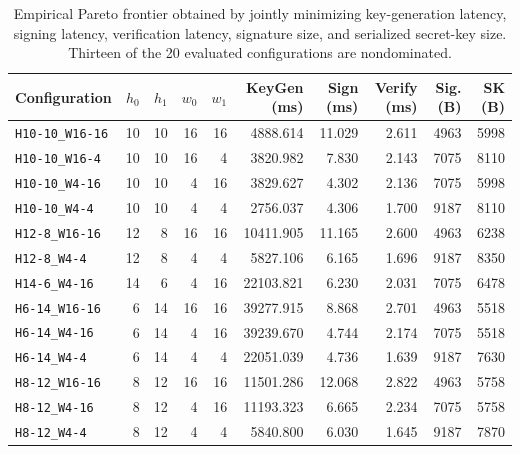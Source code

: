
\begin{table}[t]
\centering
\caption{Empirical Pareto frontier obtained by jointly minimizing key-generation latency, signing latency, verification latency, signature size, and serialized secret-key size. Thirteen of the 20 evaluated configurations are nondominated.}
\label{tab:pareto}
\scriptsize
\setlength{\tabcolsep}{2.5pt}
\begin{tabular}{lrrrrrrrrr}
\toprule
Configuration &
$h_0$ & $h_1$ & $w_0$ & $w_1$ &
KeyGen (ms) & Sign (ms) & Verify (ms) &
Sig. (B) & SK (B) \\
\midrule
\nolinkurl{H10-10_W16-16} & 10 & 10 & 16 & 16 & 4888.614 & 11.029 & 2.611 & 4963 & 5998 \\
\nolinkurl{H10-10_W16-4} & 10 & 10 & 16 & 4 & 3820.982 & 7.830 & 2.143 & 7075 & 8110 \\
\nolinkurl{H10-10_W4-16} & 10 & 10 & 4 & 16 & 3829.627 & 4.302 & 2.136 & 7075 & 5998 \\
\nolinkurl{H10-10_W4-4} & 10 & 10 & 4 & 4 & 2756.037 & 4.306 & 1.700 & 9187 & 8110 \\
\nolinkurl{H12-8_W16-16} & 12 & 8 & 16 & 16 & 10411.905 & 11.165 & 2.600 & 4963 & 6238 \\
\nolinkurl{H12-8_W4-4} & 12 & 8 & 4 & 4 & 5827.106 & 6.165 & 1.696 & 9187 & 8350 \\
\nolinkurl{H14-6_W4-16} & 14 & 6 & 4 & 16 & 22103.821 & 6.230 & 2.031 & 7075 & 6478 \\
\nolinkurl{H6-14_W16-16} & 6 & 14 & 16 & 16 & 39277.915 & 8.868 & 2.701 & 4963 & 5518 \\
\nolinkurl{H6-14_W4-16} & 6 & 14 & 4 & 16 & 39239.670 & 4.744 & 2.174 & 7075 & 5518 \\
\nolinkurl{H6-14_W4-4} & 6 & 14 & 4 & 4 & 22051.039 & 4.736 & 1.639 & 9187 & 7630 \\
\nolinkurl{H8-12_W16-16} & 8 & 12 & 16 & 16 & 11501.286 & 12.068 & 2.822 & 4963 & 5758 \\
\nolinkurl{H8-12_W4-16} & 8 & 12 & 4 & 16 & 11193.323 & 6.665 & 2.234 & 7075 & 5758 \\
\nolinkurl{H8-12_W4-4} & 8 & 12 & 4 & 4 & 5840.800 & 6.030 & 1.645 & 9187 & 7870 \\
\bottomrule
\end{tabular}
\end{table}
